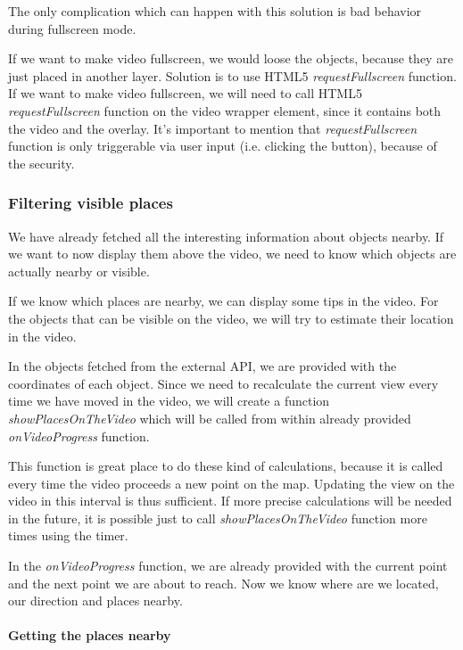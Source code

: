 \documentclass[journal]{IEEEtran}
\begin{document}
The only complication which can happen with this solution is bad behavior during fullscreen mode.

If we want to make video fullscreen, we would loose the objects, because they are just placed in another layer. Solution is to use HTML5 \textit{requestFullscreen} function. If we want to make video fullscreen, we will need to call HTML5 \textit{requestFullscreen} function on the video wrapper element, since it contains both the video and the overlay. It's important to mention that \textit{requestFullscreen} function is only triggerable via user input (i.e. clicking the button), because of the security.

\subsubsection{Filtering visible places}

We have already fetched all the interesting information about objects nearby. If we want to now display them above the video, we need to know which objects are actually nearby or visible.

If we know which places are nearby, we can display some tips in the video. For the objects that can be visible on the video, we will try to estimate their location in the video.

In the objects fetched from the external API, we are provided with the coordinates of each object. Since we need to recalculate the current view every time we have moved in the video, we will create a function \textit{showPlacesOnTheVideo} which will be called from within already provided \textit{onVideoProgress} function.

	This function is great place to do these kind of calculations, because it is called every time the video proceeds a new point on the map. Updating the view on the video in this interval is thus sufficient. If more precise calculations will be needed in the future, it is possible just to call \textit{showPlacesOnTheVideo} function more times using the timer.
	
	In the \textit{onVideoProgress} function, we are already provided with the current point and the next point we are about to reach. Now we know where are we located, our direction and places nearby.

\paragraph{Getting the places nearby}
\end{document}
